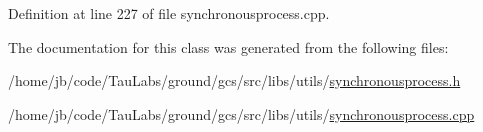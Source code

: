 \-Definition at line 227 of file synchronousprocess.\-cpp.



\-The documentation for this class was generated from the following files\-:\begin{DoxyCompactItemize}
\item 
/home/jb/code/\-Tau\-Labs/ground/gcs/src/libs/utils/\hyperlink{synchronousprocess_8h}{synchronousprocess.\-h}\item 
/home/jb/code/\-Tau\-Labs/ground/gcs/src/libs/utils/\hyperlink{synchronousprocess_8cpp}{synchronousprocess.\-cpp}\end{DoxyCompactItemize}
